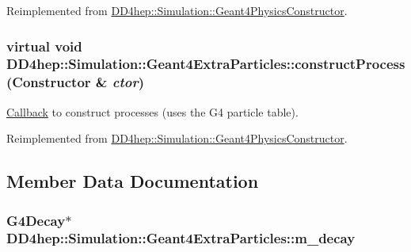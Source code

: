 Reimplemented from \hyperlink{class_d_d4hep_1_1_simulation_1_1_geant4_physics_constructor_a2568ea7c84c0514818e665c409efa304}{DD4hep::Simulation::Geant4PhysicsConstructor}.\hypertarget{class_d_d4hep_1_1_simulation_1_1_geant4_extra_particles_aa87e3c12da9259e49a15a35a5c76698c}{
\subsubsection[{constructProcess}]{\setlength{\rightskip}{0pt plus 5cm}virtual void DD4hep::Simulation::Geant4ExtraParticles::constructProcess ({\bf Constructor} \& {\em ctor})}}
\label{class_d_d4hep_1_1_simulation_1_1_geant4_extra_particles_aa87e3c12da9259e49a15a35a5c76698c}


\hyperlink{class_d_d4hep_1_1_callback}{Callback} to construct processes (uses the G4 particle table). 

Reimplemented from \hyperlink{class_d_d4hep_1_1_simulation_1_1_geant4_physics_constructor_a11d516af4f7dcfefe4fa7f154cba4386}{DD4hep::Simulation::Geant4PhysicsConstructor}.

\subsection{Member Data Documentation}
\hypertarget{class_d_d4hep_1_1_simulation_1_1_geant4_extra_particles_a83b8c92a3c21c6068ddfe5f93ac650df}{
\subsubsection[{m\_\-decay}]{\setlength{\rightskip}{0pt plus 5cm}G4Decay$\ast$ {\bf DD4hep::Simulation::Geant4ExtraParticles::m\_\-decay}}}
\label{class_d_d4hep_1_1_simulation_1_1_geant4_extra_particles_a83b8c92a3c21c6068ddfe5f93ac650df}


